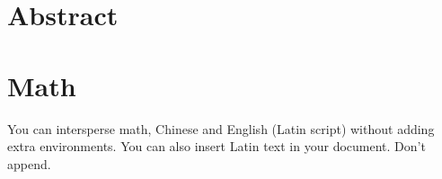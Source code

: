 \documentclass{article}
\begin{document}
\section{Abstract}
 
\section{Math}
You can intersperse math, Chinese and English (Latin script) without adding extra environments. You can also insert Latin text in your document. Don't append.


 
\end{document}
